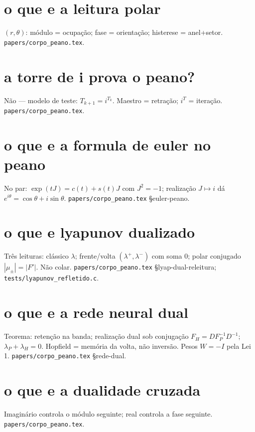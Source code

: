 \documentclass[11pt,a4paper]{article}
\newcommand{\code}[1]{\texttt{\small #1}}
\begin{document}
\section{o que e a leitura polar}
$(r,\theta)$: módulo = ocupação; fase = orientação; histerese = anel+setor.
\code{papers/corpo\_peano.tex}.

\section{a torre de i prova o peano?}
Não --- modelo de teste: $T_{k+1}=i^{T_k}$. Maestro = retração; $i^{T}$ = iteração.
\code{papers/corpo\_peano.tex}.

\section{o que e a formula de euler no peano}
No par: $\exp(tJ)=c(t)+s(t)J$ com $J^{2}=-1$; realização $J\mapsto i$ dá $e^{i\theta}=\cos\theta+i\sin\theta$.
\code{papers/corpo\_peano.tex} \S euler-peano.

\section{o que e lyapunov dualizado}
Três leituras: clássico $\lambda$; frente/volta $(\lambda^{+},\lambda^{-})$ com soma $0$; polar conjugado $|\mu_{\pm}|=|F'|$.
Não colar. \code{papers/corpo\_peano.tex} \S lyap-dual-releitura; \code{tests/lyapunov\_refletido.c}.

\section{o que e a rede neural dual}
Teorema: retenção na banda; realização dual sob conjugação $F_H=D F_P^{-1} D^{-1}$; $\lambda_P+\lambda_H=0$.
Hopfield = memória da volta, não inversão. Pesos $W=-I$ pela Lei 1.
\code{papers/corpo\_peano.tex} \S rede-dual.

\section{o que e a dualidade cruzada}
Imaginário controla o módulo seguinte; real controla a fase seguinte.
\code{papers/corpo\_peano.tex}.
\end{document}
